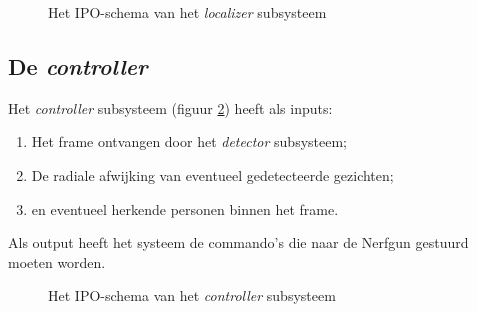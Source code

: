 \begin{figure}[H]
    \begin{center}
        
    \end{center}
    \caption{Het IPO-schema van het \emph{localizer} subsysteem}
    \label{fig:ipo-localizer}
\end{figure}

\subsection{De \emph{controller}}

Het \emph{controller} subsysteem (figuur \ref{fig:ipo-controller}) heeft als inputs:

\begin{enumerate}
    \item Het frame ontvangen door het \emph{detector} subsysteem;
    \item De radiale afwijking van eventueel gedetecteerde gezichten;
    \item en eventueel herkende personen binnen het frame.
\end{enumerate}

Als output heeft het systeem de commando's die naar de Nerfgun gestuurd moeten
worden.

\begin{figure}[H]
    \begin{center}
        
    \end{center}
    \caption{Het IPO-schema van het \emph{controller} subsysteem}
    \label{fig:ipo-controller}
\end{figure}
